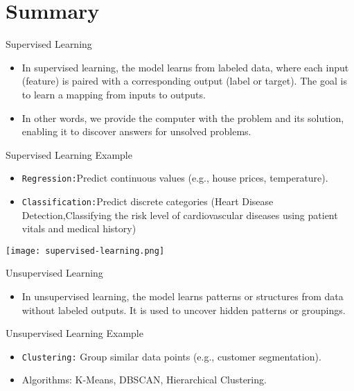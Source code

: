 \documentclass[serif, aspectratio=169]{beamer}
\begin{document}
\section{Summary}
\begin{frame}{Supervised Learning}
    \begin{itemize}
        \item In supervised learning, the model learns from labeled data, where each input (feature) is paired with a corresponding output (label or target). The goal is to learn a mapping from inputs to outputs.
        \item In other words, we provide the computer with the problem and its solution, enabling it to discover answers for unsolved problems.
    \end{itemize}
\end{frame}

\begin{frame}{Supervised Learning Example}
    \begin{itemize}
        \item \texttt{\color{orange}Regression:}Predict continuous values (e.g., house prices, temperature).
        \item \texttt{\color{orange}Classification:}Predict discrete categories (Heart Disease Detection,Classifying the risk level of cardiovascular diseases using patient vitals and medical history)
    \end{itemize}
\end{frame}

\begin{frame}
    \centering
    \texttt{[image: supervised-learning.png]}
\end{frame}

\begin{frame}{Unsupervised Learning}
    \begin{itemize}
        \item In unsupervised learning, the model learns patterns or structures from data without labeled outputs. It is used to uncover hidden patterns or groupings.
    \end{itemize}
\end{frame}

\begin{frame}{Unsupervised Learning Example}
    \begin{itemize}
        \item \texttt{\color{orange}Clustering:} Group similar data points (e.g., customer segmentation).
        \item Algorithms: K-Means, DBSCAN, Hierarchical Clustering.
    \end{itemize}
\end{frame}
\end{document}
